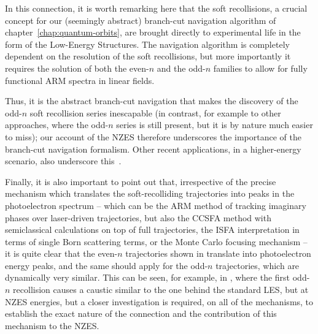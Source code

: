 In this connection, it is worth remarking here that the soft recollisions, a crucial concept for our (seemingly abstract) branch-cut navigation algorithm of chapter~\ref{chap:quantum-orbits}, are brought directly to experimental life in the form of the Low-Energy Structures. The navigation algorithm is completely dependent on the resolution of the soft recollisions, but more importantly it requires the solution of both the even-$n$ and the odd-$n$ families to allow for fully functional ARM spectra in linear fields. 

Thus, it is the abstract branch-cut navigation that makes the discovery of the odd-$n$ soft recollision series inescapable (in contrast, for example to other approaches, where the odd-$n$ series is still present, but it is by nature much easier to miss); our account of the NZES therefore underscores the importance of the branch-cut navigation formalism. Other recent applications, in a higher-energy scenario, also underscore this~\cite{keil_branch-cuts_2016}.



Finally, it is also important to point out that, irrespective of the precise mechanism which translates the soft-recolliding trajectories into peaks in the photoelectron spectrum -- which can be the ARM method of tracking imaginary phases over laser-driven trajectories, but also the CCSFA method with semiclassical calculations on top of full trajectories, the ISFA interpretation in terms of single Born scattering terms, or the Monte Carlo focusing mechanism -- it is quite clear that the even-$n$ trajectories shown in  translate into photoelectron energy peaks, and the same should apply for the odd-$n$ trajectories, which are dynamically very similar. This can be seen, for example, in , where the first odd-$n$ recollision causes a caustic similar to the one behind the standard LES, but at NZES energies, but a closer investigation is required, on all of the mechanisms, to establish the exact nature of the connection and the contribution of this mechanism to the NZES.







































